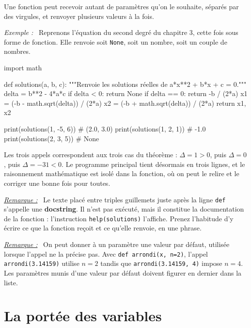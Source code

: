 \documentclass[a4paper,11pt,openany]{book}
\newcommand{\mot}[1]{\textcolor{rougecours}{\textbf{#1}}}
\newcommand{\code}[1]{\texttt{\textcolor{codebleu}{#1}}}
\newenvironment{exemple}%
 {\par\vspace{1mm}\begin{list}{}{\leftmargin=1cm \rightmargin=0.5cm}\item[]%
  \textit{Exemple :}~}%
 {\end{list}\vspace{1mm}}
\newenvironment{remarque}%
 {\par\vspace{1mm}\begin{list}{}{\leftmargin=1cm \rightmargin=0.5cm}\item[]%
  \textit{\underline{Remarque :}}~}%
 {\end{list}\vspace{1mm}}
\begin{document}
Une fonction peut recevoir autant de paramètres qu'on le souhaite, séparés par des virgules, et renvoyer plusieurs valeurs à la fois.

\begin{exemple}
Reprenons l'équation du second degré du chapitre 3, cette fois sous forme de fonction. Elle renvoie soit \code{None}, soit un nombre, soit un couple de nombres.
\begin{python}
import math

def solutions(a, b, c):
    """Renvoie les solutions réelles de a*x**2 + b*x + c = 0."""
    delta = b**2 - 4*a*c
    if delta < 0:
        return None
    if delta == 0:
        return -b / (2*a)
    x1 = (-b - math.sqrt(delta)) / (2*a)
    x2 = (-b + math.sqrt(delta)) / (2*a)
    return x1, x2

print(solutions(1, -5, 6))    # (2.0, 3.0)
print(solutions(1, 2, 1))     # -1.0
print(solutions(2, 3, 5))     # None
\end{python}
Les trois appels correspondent aux trois cas du théorème : $\Delta = 1 > 0$, puis $\Delta = 0$, puis $\Delta = -31 < 0$. Le programme principal tient désormais en trois lignes, et le raisonnement mathématique est isolé dans la fonction, où on peut le relire et le corriger une bonne fois pour toutes.
\end{exemple}

\begin{remarque}
Le texte placé entre triples guillemets juste après la ligne \code{def} s'appelle une \mot{docstring}. Il n'est pas exécuté, mais il constitue la documentation de la fonction : l'instruction \code{help(solutions)} l'affiche. Prenez l'habitude d'y écrire ce que la fonction reçoit et ce qu'elle renvoie, en une phrase.
\end{remarque}

\begin{remarque}
On peut donner à un paramètre une valeur par défaut, utilisée lorsque l'appel ne la précise pas. Avec \code{def arrondi(x, n=2)}, l'appel \code{arrondi(3.14159)} utilise $n = 2$ tandis que \code{arrondi(3.14159, 4)} impose $n = 4$. Les paramètres munis d'une valeur par défaut doivent figurer en dernier dans la liste.
\end{remarque}

\section{La portée des variables}
\end{document}
